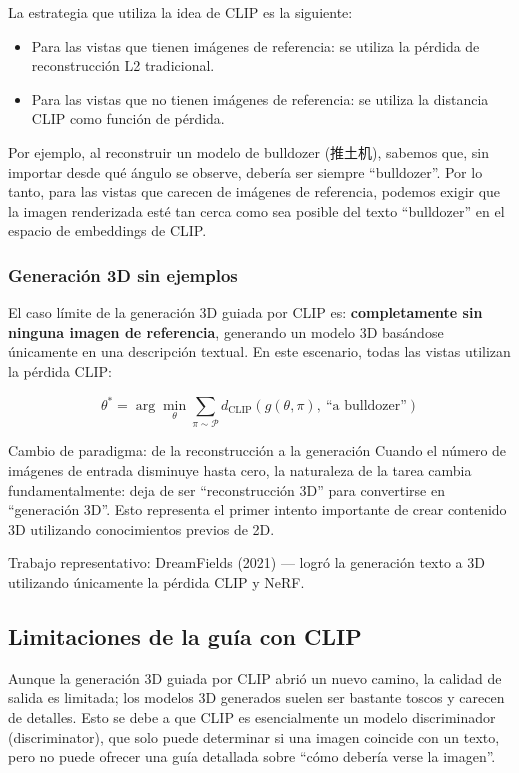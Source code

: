\documentclass[a4paper]{article}
\begin{document}
La estrategia que utiliza la idea de CLIP es la siguiente:
\begin{itemize}
    \item Para las vistas que tienen imágenes de referencia: se utiliza la pérdida de reconstrucción L2 tradicional.
    \item Para las vistas que no tienen imágenes de referencia: se utiliza la distancia CLIP como función de pérdida.
\end{itemize}

Por ejemplo, al reconstruir un modelo de bulldozer (推土机), sabemos que, sin importar desde qué ángulo se observe, debería ser siempre ``bulldozer''. Por lo tanto, para las vistas que carecen de imágenes de referencia, podemos exigir que la imagen renderizada esté tan cerca como sea posible del texto ``bulldozer'' en el espacio de embeddings de CLIP.

\subsubsection{Generación 3D sin ejemplos}

El caso límite de la generación 3D guiada por CLIP es: \textbf{completamente sin ninguna imagen de referencia}, generando un modelo 3D basándose únicamente en una descripción textual. En este escenario, todas las vistas utilizan la pérdida CLIP:

$$
\theta^* = \arg\min_{\theta} \sum_{\pi \sim \mathcal{P}} d_{\text{CLIP}}(g(\theta, \pi),\ \text{``a bulldozer''})
$$

\begin{importantbox}{Cambio de paradigma: de la reconstrucción a la generación}
Cuando el número de imágenes de entrada disminuye hasta cero, la naturaleza de la tarea cambia fundamentalmente: deja de ser ``reconstrucción 3D'' para convertirse en ``generación 3D''. Esto representa el primer intento importante de crear contenido 3D utilizando conocimientos previos de 2D.

Trabajo representativo: DreamFields (2021) — logró la generación texto a 3D utilizando únicamente la pérdida CLIP y NeRF.
\end{importantbox}

\subsection{Limitaciones de la guía con CLIP}

Aunque la generación 3D guiada por CLIP abrió un nuevo camino, la calidad de salida es limitada; los modelos 3D generados suelen ser bastante toscos y carecen de detalles. Esto se debe a que CLIP es esencialmente un modelo discriminador (discriminator), que solo puede determinar si una imagen coincide con un texto, pero no puede ofrecer una guía detallada sobre ``cómo debería verse la imagen''.
\end{document}
